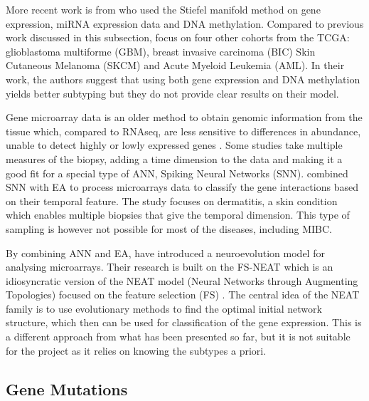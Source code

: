 More recent work is from \citet{Tian2021-vu} who used the Stiefel manifold method on gene expression, miRNA expression data and DNA methylation. Compared to previous work discussed in this subsection, \citet{Tian2021-vu} focus on four other cohorts from the TCGA: glioblastoma multiforme (GBM), breast invasive carcinoma (BIC) Skin Cutaneous Melanoma (SKCM) and Acute Myeloid Leukemia (AML). In their work, the authors suggest that using both gene expression and DNA methylation yields better subtyping but they do not provide clear results on their model.

Gene microarray data is an older method to obtain genomic information from the tissue which, compared to RNAseq, are less sensitive to differences in abundance, unable to detect highly or lowly expressed genes \citep{Wang2009-lj}. Some studies take multiple measures of the biopsy, adding a time dimension to the data and making it a good fit for a special type of ANN, Spiking Neural Networks (SNN). \citet{Capecci2020-uj} combined SNN with EA to process microarrays data to classify the gene interactions based on their temporal feature. The study focuses on dermatitis, a skin condition which enables multiple biopsies that give the temporal dimension. This type of sampling is however not possible for most of the diseases, including MIBC.

By combining ANN and EA, \citet{Grisci2019-xn} have introduced a neuroevolution model for analysing microarrays. Their research is built on the FS-NEAT \citep{Whiteson2005-dn} which is an idiosyncratic version of the NEAT model (Neural Networks through Augmenting Topologies) focused on the feature selection (FS) \citep{Stanley2002-tg}. The central idea of the NEAT family is to use evolutionary methods to find the optimal initial network structure, which then can be used for classification of the gene expression. This is a different approach from what has been presented so far, but it is not suitable for the project as it relies on knowing the subtypes a priori.

\subsection{Gene Mutations} \label{s:lit:mutations}

\vspace{3mm}
\vspace{3mm}


